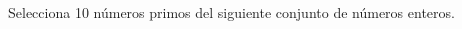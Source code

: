 \question[10]  Selecciona 10 n\'umeros primos del siguiente conjunto de n\'umeros enteros.
\begin{multicols}{6}
    \begin{checkboxes}
    \end{checkboxes}
\end{multicols}